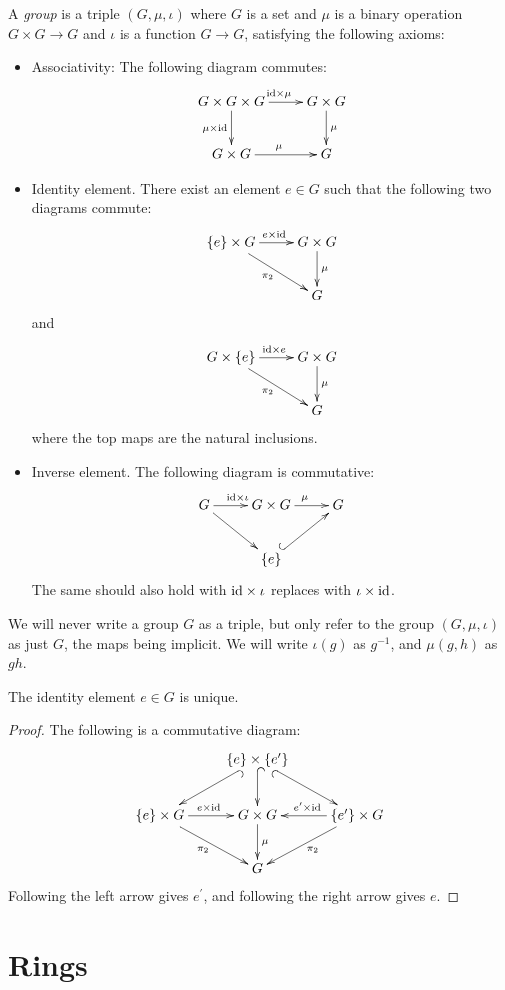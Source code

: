 \documentclass[11pt, norsk]{book}
\begin{document}
\begin{defi}
A \emph{group} is a triple $(G,\mu,\iota)$ where $G$ is a set and $\mu$ is a binary operation $G \times G \to G$ and $\iota$ is a function $G \to G$, satisfying the following axioms:
\begin{itemize}
\item Associativity: The following diagram commutes:
\[
\xymatrix{
G \times G \times G \ar[r]^{\id \times \mu} \ar[d]_{\mu \times \id} & G \times G \ar[d]^\mu \\
G \times G \ar[r]^\mu & G
}
\]
\item Identity element. There exist an element $e \in G$ such that the following two diagrams commute:
\[
\xymatrix{
\{ e \} \times G \ar[r]^{e \times \id} \ar[dr]_{\pi_2} & G \times G \ar[d]^{\mu} \\
& G 
}
\]
and
\[
\xymatrix{
G \times \{e \} \ar[r]^{\id \times e} \ar[dr]_{\pi_2} & G \times G \ar[d]^{\mu} \\
& G 
}
\]
where the top maps are the natural inclusions.
\item Inverse element. The following diagram is commutative:
\[
\xymatrix{
G \ar[r]^{\id \times \iota} \ar[dr] & G \times G \ar[r]^\mu & G \\
& \{e \} \ar@{^(->}[ur]
}
\]
The same should also hold with $\text{id} \times \iota$ replaces with $\iota \times \text{id}$.
\end{itemize}
\end{defi}
We will never write a group $G$ as a triple, but only refer to the group $(G,\mu,\iota)$ as just $G$, the maps being implicit. We will write $\iota(g)$ as $g^{-1}$, and $\mu(g,h)$ as $gh$.

\begin{lemma}
The identity element $e \in G$ is unique.
\end{lemma}
\begin{proof}
The following is a commutative diagram:
\[
\xymatrix{
& \{e \} \times \{ e^\prime \} \ar@{^(->}[dl] \ar@{^(->}[d] \ar@{_(->}[dr] & \\
\{ e\} \times G \ar[r]^{e \times \id} \ar[dr]_{\pi_2} & G \times G  \ar[d]^{\mu}& \{ e'\}  \times G  \ar[l]_{e^\prime \times \id} \ar[dl]^{\pi_2}\\
& G
} 
\]
Following the left arrow gives $e^\prime$, and following the right arrow gives $e$.
\end{proof}

\chapter{Rings}
\end{document}
